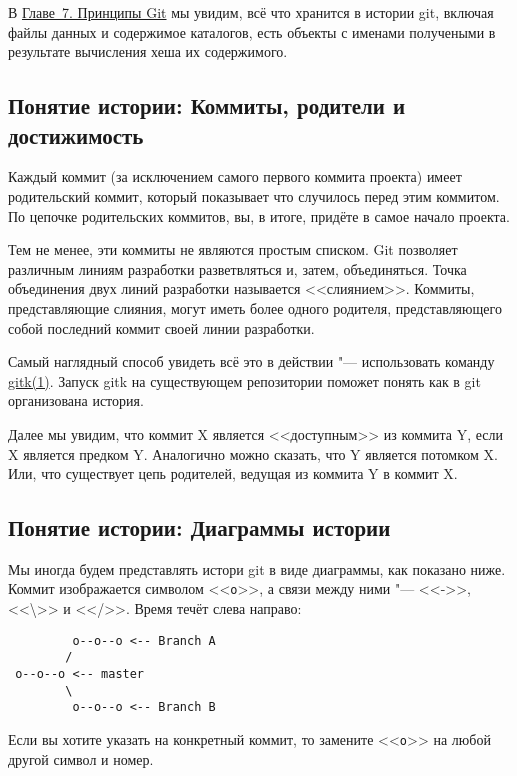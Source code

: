 \documentclass[a4paper, 12pt]{report}
\begin{document}
В \href{#chapter7}{Главе~7. Принципы Git} мы увидим, всё что хранится в истории git,
включая файлы данных и содержимое каталогов, есть объекты с именами получеными в
результате вычисления хеша их содержимого.


\subsection{Понятие истории: Коммиты, родители и достижимость}

Каждый коммит (за исключением самого первого коммита проекта) имеет родительский
коммит, который показывает что случилось перед этим коммитом. По цепочке родительских
коммитов, вы, в итоге, придёте в самое начало проекта. 

Тем не менее, эти коммиты не являются простым списком. Git позволяет различным
линиям разработки разветвляться и, затем, объединяться. Точка объединения двух
линий разработки называется <<слиянием>>. Коммиты, представляющие слияния, могут
иметь более одного родителя, представляющего собой последний коммит своей линии
разработки.

Самый наглядный способ увидеть всё это в действии "--- использовать команду
\href{http://www.kernel.org/pub/software/scm/git/docs/gitk.html}{gitk(1)}. 
Запуск gitk на существующем репозитории поможет понять как в git организована
история.

Далее мы увидим, что коммит X является <<доступным>> из коммита Y, если X является
предком Y. Аналогично можно сказать, что Y является потомком X. Или, что существует
цепь родителей, ведущая из коммита Y в коммит X.


\subsection{Понятие истории: Диаграммы истории}

Мы иногда будем представлять истори git в виде диаграммы, как показано ниже. Коммит
изображается символом <<\texttt{\small o}>>, а связи между ними "--- <<->>, 
<<\textbackslash>> и <</>>. Время течёт слева направо:

\begin{lstlisting}
         o--o--o <-- Branch A
        /
 o--o--o <-- master
        \
         o--o--o <-- Branch B
\end{lstlisting}

Если вы хотите указать на конкретный коммит, то замените <<\texttt{\small o}>> на любой другой
символ и номер.
\end{document}
